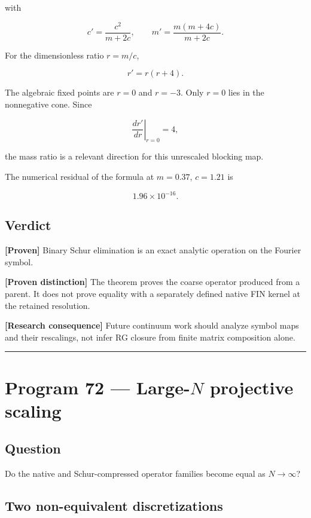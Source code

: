 \documentclass[11pt,a4paper,openany]{report}
\newcommand{\statusProven}{\textcolor{fingreen}{[Proven]}}
\begin{document}
with

\[
c'=\frac{c^2}{m+2c},
\qquad
m'=\frac{m(m+4c)}{m+2c}.
\]

For the dimensionless ratio \(r=m/c\),

\[
r'=r(r+4).
\]

The algebraic fixed points are \(r=0\) and \(r=-3\). Only \(r=0\) lies in the nonnegative cone. Since

\[
\left.\frac{dr'}{dr}\right|_{r=0}=4,
\]

the mass ratio is a relevant direction for this unrescaled blocking map.

The numerical residual of the formula at \(m=0.37\), \(c=1.21\) is

\[
1.96\times10^{-16}.
\]

\section{Verdict}

\textbf{\statusProven{}} Binary Schur elimination is an exact analytic operation on the Fourier symbol.

\textbf{[Proven distinction]} The theorem proves the coarse operator produced from a parent. It does not prove equality with a separately defined native FIN kernel at the retained resolution.

\textbf{[Research consequence]} Future continuum work should analyze symbol maps and their rescalings, not infer RG closure from finite matrix composition alone.

\par\medskip\hrule\medskip

\chapter{\texorpdfstring{Program 72 --- Large-\(N\) projective scaling}{Program 72 --- Large-N projective scaling}}

\section{Question}

Do the native and Schur-compressed operator families become equal as \(N\to\infty\)?

\section{Two non-equivalent discretizations}
\end{document}
